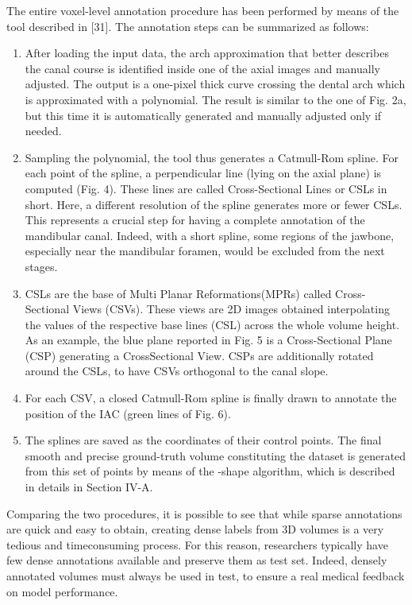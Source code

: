 The entire voxel-level annotation procedure has been performed by means of the tool described in [31]. The annotation
steps can be summarized as follows:
\begin{enumerate}
  \item{After loading the input data, the arch approximation that
  better describes the canal course is identified inside one
  of the axial images and manually adjusted. The output
  is a one-pixel thick curve crossing the dental arch which
  is approximated with a polynomial. The result is similar
  to the one of Fig. 2a, but this time it is automatically
  generated and manually adjusted only if needed.}

  \item{Sampling the polynomial, the tool thus generates a
  Catmull-Rom spline. For each point of the spline, a perpendicular line (lying on the axial plane) is computed
  (Fig. 4). These lines are called Cross-Sectional Lines or
  CSLs in short. Here, a different resolution of the spline
  generates more or fewer CSLs. This represents a crucial
  step for having a complete annotation of the mandibular
  canal. Indeed, with a short spline, some regions of the
  jawbone, especially near the mandibular foramen,
  would be excluded from the next stages.}

  \item{CSLs are the base of Multi Planar Reformations(MPRs) called
  Cross-Sectional Views (CSVs). These views are 2D images obtained interpolating
  the values of the respective base lines (CSL) across the whole volume height.
  As an example, the blue plane reported in Fig. 5 is a Cross-Sectional Plane
  (CSP) generating a CrossSectional View. CSPs are additionally rotated around
  the CSLs, to have CSVs orthogonal to the canal slope.}

  \item{For each CSV, a closed Catmull-Rom spline is finally drawn to annotate
  the position of the IAC (green lines of Fig. 6).}

  \item{The splines are saved as the coordinates of their control points. The
  final smooth and precise ground-truth volume constituting the dataset is
  generated from this set of points by means of the \textalpha-shape algorithm, which is
  described in details in Section IV-A.}
\end{enumerate}

Comparing the two procedures, it is possible to see that while sparse
annotations are quick and easy to obtain, creating dense labels from 3D volumes
is a very tedious and timeconsuming process. For this reason, researchers
typically have few dense annotations available and preserve them as test set.
Indeed, densely annotated volumes must always be used in test, to ensure a real
medical feedback on model performance.

